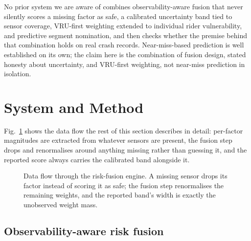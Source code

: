 \documentclass[journal]{IEEEtran}
\begin{document}
No prior system we are aware of combines observability-aware fusion that never silently scores a missing factor as safe, a calibrated uncertainty band tied to sensor coverage, VRU-first weighting extended to individual rider vulnerability, and predictive segment nomination, and then checks whether the premise behind that combination holds on real crash records. Near-miss-based prediction is well established on its own; the claim here is the combination of fusion design, stated honesty about uncertainty, and VRU-first weighting, not near-miss prediction in isolation.

\section{System and Method}

Fig.~\ref{fig:architecture} shows the data flow the rest of this section describes in detail: per-factor magnitudes are extracted from whatever sensors are present, the fusion step drops and renormalises around anything missing rather than guessing it, and the reported score always carries the calibrated band alongside it.

\begin{figure}[t]
\centering
{}
\caption{Data flow through the risk-fusion engine. A missing sensor drops its factor instead of scoring it as safe; the fusion step renormalises the remaining weights, and the reported band's width is exactly the unobserved weight mass.}
\label{fig:architecture}
\end{figure}

\subsection{Observability-aware risk fusion}
\end{document}
